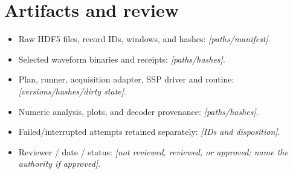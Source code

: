 \documentclass[11pt,a4paper]{article}
\newcommand{\entry}[1]{\textcolor{blue!60!black}{\textit{[#1]}}}
\begin{document}
\section{Artifacts and review}
\begin{itemize}
\item Raw HDF5 files, record IDs, windows, and hashes: \entry{paths/manifest}.
\item Selected waveform binaries and receipts: \entry{paths/hashes}.
\item Plan, runner, acquisition adapter, SSP driver and routine: \entry{versions/hashes/dirty state}.
\item Numeric analysis, plots, and decoder provenance: \entry{paths/hashes}.
\item Failed/interrupted attempts retained separately: \entry{IDs and disposition}.
\item Reviewer / date / status: \entry{not reviewed, reviewed, or approved; name the authority if approved}.
\end{itemize}
\end{document}
